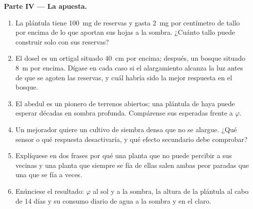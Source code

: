 \begin{problem}
\medskip
\noindent\textbf{Parte IV --- La apuesta.}
\begin{enumerate}[resume]
  \item La plántula tiene \qty{100}{mg} de reservas y gasta \qty{2}{mg} por
        centímetro de tallo por encima de lo que aportan sus hojas a la
        sombra. ¿Cuánto tallo puede construir solo con sus reservas?
  \item El dosel es un ortigal situado \qty{40}{cm} por encima; después,
        un bosque situado \qty{8}{m} por encima. Dígase en cada caso si el
        alargamiento alcanza la luz antes de que se agoten las reservas, y
        cuál habría sido la mejor respuesta en el bosque.
  \item El abedul es un pionero de terrenos abiertos; una plántula de haya
        puede esperar décadas en sombra profunda. Compárense sus  esperadas frente a $\varphi$.
  \item Un mejorador quiere un cultivo de siembra densa que no se alargue.
        ¿Qué sensor o qué respuesta desactivaría, y qué efecto secundario
        debe comprobar?
  \item Explíquese en dos frases por qué una planta que no puede percibir
        a sus vecinas y una planta que siempre se fía de ellas salen ambas
        peor paradas que una que se fía a veces.
  \item Enúnciese el resultado: $\varphi$ al sol y a la sombra, la altura de
        la plántula al cabo de 14 días y su consumo diario de agua a la
        sombra y en el claro.
\end{enumerate}
\end{problem}
